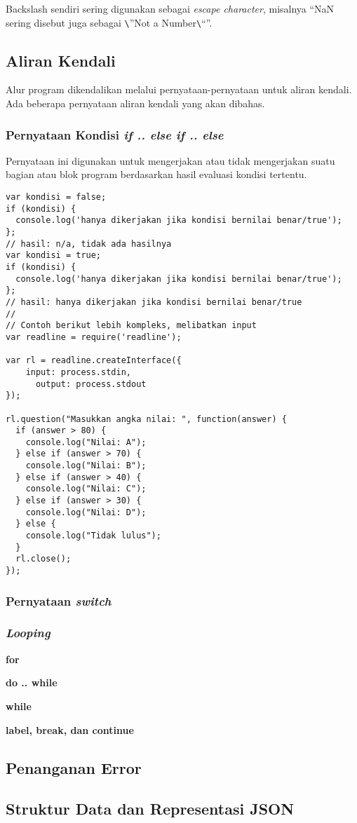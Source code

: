 Backslash sendiri sering digunakan sebagai \textit{escape character}, misalnya ``NaN sering disebut juga sebagai \verb+\+''Not a Number\verb+\+``''.

\subsection{Aliran Kendali}

Alur program dikendalikan melalui pernyataan-pernyataan untuk aliran kendali. Ada beberapa pernyataan aliran kendali yang akan dibahas.

\subsubsection{Pernyataan Kondisi \textit{if .. else if .. else}}

Pernyataan ini digunakan untuk mengerjakan atau tidak mengerjakan suatu bagian atau blok program berdasarkan hasil evaluasi kondisi tertentu.

\begin{lstlisting}
var kondisi = false;
if (kondisi) {
  console.log('hanya dikerjakan jika kondisi bernilai benar/true');
};
// hasil: n/a, tidak ada hasilnya
var kondisi = true;
if (kondisi) {
  console.log('hanya dikerjakan jika kondisi bernilai benar/true');
};
// hasil: hanya dikerjakan jika kondisi bernilai benar/true
//
// Contoh berikut lebih kompleks, melibatkan input
var readline = require('readline');

var rl = readline.createInterface({
    input: process.stdin,
      output: process.stdout
});

rl.question("Masukkan angka nilai: ", function(answer) {
  if (answer > 80) {
    console.log("Nilai: A");
  } else if (answer > 70) {
    console.log("Nilai: B");
  } else if (answer > 40) {
    console.log("Nilai: C");
  } else if (answer > 30) {
    console.log("Nilai: D");
  } else {
    console.log("Tidak lulus");
  }
  rl.close();
});
\end{lstlisting}

\subsubsection{Pernyataan \textit{switch}}


\subsubsection{\textit{Looping}}


\textbf{for}


\textbf{do .. while}


\textbf{while}


\textbf{label, break, dan continue}


\subsection{Penanganan Error}

\subsection{Struktur Data dan Representasi JSON}

